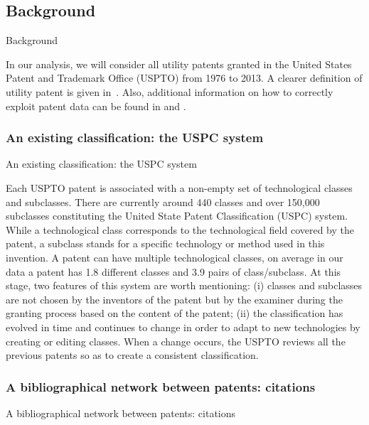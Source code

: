 \subsection*{Background \label{data}}{Background}

In our analysis, we will consider all utility patents granted in the United States Patent and Trademark Office (USPTO) from 1976 to 2013. A clearer definition of utility patent is given in~. Also, additional information on how to correctly exploit patent data can be found in \cite{Hall2001} and \cite{lerner2015use}.

\subsubsection*{An existing classification: the USPC system}{An existing classification: the USPC system}

Each USPTO patent is associated with a non-empty set of technological classes and subclasses. There are currently around 440 classes and over 150,000 subclasses constituting the United State Patent Classification (USPC) system. While a technological class corresponds to the technological field covered by the patent, a subclass stands for a specific technology or method used in this invention. A patent can have multiple technological classes, on average in our data a patent has 1.8 different classes and 3.9 pairs of class/subclass. At this stage, two features of this system are worth mentioning: (i) classes and subclasses are not chosen by the inventors of the patent but by the examiner during the granting process based on the content of the patent; (ii) the classification has evolved in time and continues to change in order to adapt to new technologies by creating or editing classes. When a change occurs, the USPTO reviews all the previous patents so as to create a consistent classification.

\subsubsection*{A bibliographical network between patents: citations \label{sub:citation}}{A bibliographical network between patents: citations}

